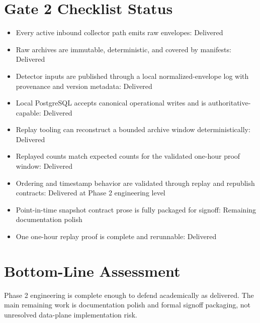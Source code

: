 \documentclass{article}
\begin{document}
\section*{Gate 2 Checklist Status}
\begin{itemize}
\item Every active inbound collector path emits raw envelopes: Delivered
\item Raw archives are immutable, deterministic, and covered by manifests: Delivered
\item Detector inputs are published through a local normalized-envelope log with provenance and version metadata: Delivered
\item Local PostgreSQL accepts canonical operational writes and is authoritative-capable: Delivered
\item Replay tooling can reconstruct a bounded archive window deterministically: Delivered
\item Replayed counts match expected counts for the validated one-hour proof window: Delivered
\item Ordering and timestamp behavior are validated through replay and republish contracts: Delivered at Phase 2 engineering level
\item Point-in-time snapshot contract prose is fully packaged for signoff: Remaining documentation polish
\item One one-hour replay proof is complete and rerunnable: Delivered
\end{itemize}

\section*{Bottom-Line Assessment}
Phase 2 engineering is complete enough to defend academically as delivered. The main remaining work is documentation polish and formal signoff packaging, not unresolved data-plane implementation risk.
\end{document}
